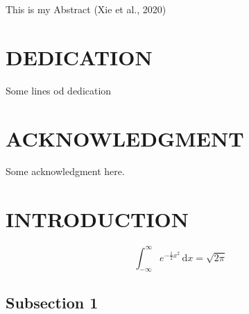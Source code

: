 \documentclass{source/tex/templates/maththesis}
\begin{document}
This is my Abstract (Xie et al., 2020)

\hypertarget{dedication}{%
\chapter*{DEDICATION}\label{dedication}}

Some lines od dedication

\hypertarget{acknowledgment}{%
\chapter*{ACKNOWLEDGMENT}\label{acknowledgment}}

Some acknowledgment here.

\tableofcontents

\newpage
{}\setcounter{page}{1}

\hypertarget{introduction}{%
\chapter{INTRODUCTION}\label{introduction}}

\[
 \int_{-\infty}^{\infty} e^{-\frac{1}{2}x^2}\,\text{d}x = \sqrt{2\pi}
\]

\hypertarget{subsection-1}{%
\section{Subsection 1}\label{subsection-1}}
\end{document}
